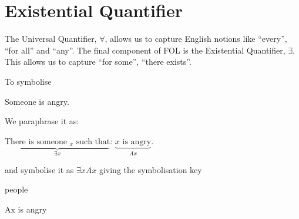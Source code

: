 %
%
%
%
%
%



\section{Existential Quantifier}
The Universal Quantifier, $\forall$, allows us to capture English notions like ``every'', ``for all'' and ``any''. The final component of FOL is the Existential Quantifier, $\exists$. This allows us to capture ``for some'', ``there exists''. 

To symbolise 
\begin{earg}
\item[\ex{q.e}] Someone is angry.
\end{earg}
We paraphrase it as:
\begin{ebullet}
\item $\underbrace{\text{There is someone $_x$ such that}}_{\exists x}$: $\underbrace{\text{$x$ is angry}}_{Ax}$. 
\end{ebullet}
and symbolise it as $\exists x Ax$ giving the symbolisation key
\begin{ekey}
\item[\text{domain}] people
\item[Ax] is angry
\end{ekey}



